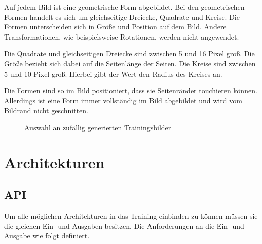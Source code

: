 Auf jedem Bild ist eine geometrische Form abgebildet.
Bei den geometrischen Formen handelt es sich um gleichseitige Dreiecke, Quadrate und Kreise.
Die Formen unterscheiden sich in Größe und Position auf dem Bild.
Andere Transformationen, wie beispielsweise Rotationen, werden nicht angewendet.
\newline

Die Quadrate und gleichseitigen Dreiecke sind zwischen 5 und 16 Pixel groß.
Die Größe bezieht sich dabei auf die Seitenlänge der Seiten.
Die Kreise sind zwischen 5 und 10 Pixel groß.
Hierbei gibt der Wert den Radius des Kreises an.
\newline

Die Formen sind so im Bild positioniert, dass sie Seitenränder touchieren können.
Allerdings ist eine Form immer vollständig im Bild abgebildet und wird vom Bildrand nicht geschnitten.

\newcommand{\trainDataImage}[1]{\subfloat{\fbox{\texttt{[image: \#1]}}}}
\begin{figure}[H]
	\centering
	\trainDataImage{kapitel/3\_methodik/data/circle\_00.png}
	\trainDataImage{kapitel/3\_methodik/data/circle\_01.png}
	\trainDataImage{kapitel/3\_methodik/data/circle\_02.png}\par 
	
	\trainDataImage{kapitel/3\_methodik/data/rectangle\_00.png}
	\trainDataImage{kapitel/3\_methodik/data/rectangle\_01.png}
	\trainDataImage{kapitel/3\_methodik/data/rectangle\_02.png}\par 
	
	\trainDataImage{kapitel/3\_methodik/data/triangle\_00.png}
	\trainDataImage{kapitel/3\_methodik/data/triangle\_01.png}
	\trainDataImage{kapitel/3\_methodik/data/triangle\_02.png}\par 
	
	\caption{Auswahl an zufällig generierten Trainingsbilder}
\end{figure}

\section{Architekturen}
\subsection{API}
Um alle möglichen Architekturen in das Training einbinden zu können müssen sie die gleichen Ein- und Ausgaben besitzen.
Die Anforderungen an die Ein- und Ausgabe wie folgt definiert.
\newline

